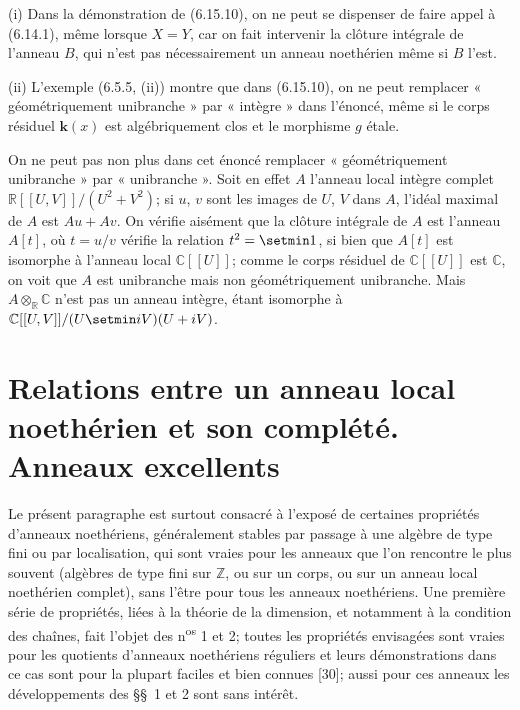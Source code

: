 \begin{remarks}[6.15.11]
\label{IV.2.s6.15.11-fr}
(i) Dans la démonstration de (6.15.10), on ne peut se dispenser de faire
appel à (6.14.1), même lorsque $X=Y$, car on fait intervenir la clôture
intégrale de l'anneau $B$, qui n'est pas nécessairement un anneau
noethérien même si $B$ l'est.

(ii) L'exemple (6.5.5, (ii)) montre que dans (6.15.10), on ne peut remplacer
« géométriquement unibranche » par « intègre » dans l'énoncé, même si
le corps résiduel $\boldsymbol{k}(x)$ est algébriquement clos et le morphisme $g$ étale.

On ne peut pas non plus dans cet énoncé remplacer « géométriquement
unibranche » par « unibranche ». Soit en effet $A$ l'anneau local intègre
complet
$\mathbb R[[U,V]]/(U^2+V^2)$; si $u$, $v$ sont les images de $U$, $V$ dans $A$, l'idéal maximal de $A$
est $Au+Av$. On vérifie aisément que la clôture intégrale de $A$ est
l'anneau $A[t]$, où $t=u/v$ vérifie la relation $t^2=\setmin 1$, si bien que
$A[t]$ est isomorphe à l'anneau local $\mathbb C[[U]]$; comme le corps
résiduel de $\mathbb C[[U]]$ est $\mathbb C$, on voit que $A$ est
unibranche mais non géométriquement unibranche. Mais
$A\otimes_{\mathbb R}\mathbb C$ n'est pas un anneau intègre, étant
isomorphe à $\mathbb C[[U,V]]/(U\setmin iV)(U+iV)$.
\end{remarks}

\section{Relations entre un anneau local noethérien et son complété. Anneaux excellents}
\label{section:IV.7-fr}

Le présent paragraphe est surtout consacré à l'exposé de certaines propriétés
d'anneaux noethériens, généralement stables par passage à une algèbre de type
fini ou par localisation, qui sont vraies pour les anneaux que l'on rencontre
le plus souvent (algèbres de type fini sur $\mathbb Z$, ou sur un corps, ou sur
un anneau local noethérien complet), sans l'être pour tous les anneaux
noethériens. Une première série de propriétés, liées à la théorie de la
dimension, et notamment à la condition des chaînes, fait l'objet des
n\textsuperscript{os} 1 et
2; toutes les propriétés envisagées sont vraies pour les quotients d'anneaux
noethériens réguliers et leurs démonstrations dans ce cas sont pour la plupart
faciles et bien connues [30]; aussi pour ces anneaux les développements des
\S\S~1 et 2 sont sans intérêt.

